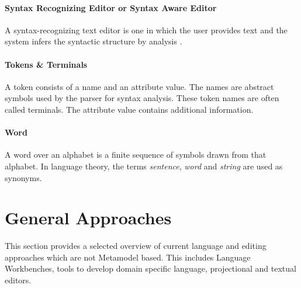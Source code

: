 \paragraph{Syntax Recognizing Editor or Syntax Aware Editor} A syntax-recognizing text editor is one in which the user provides text and the system infers the syntactic structure by analysis \cite{pan}. 

\paragraph{Tokens \& Terminals}  
A token consists of a name and an attribute value. The names are abstract symbols used by the parser for syntax analysis. These token names are often called terminals. The attribute value contains additional information. \cite{DragonBook}

\paragraph{Word} 
A word over an alphabet is a finite sequence of symbols drawn from that alphabet. In language theory, the terms \emph{sentence}, \emph{word} and \emph{string} are used as synonyms. \cite{DragonBook}



\section{General Approaches} \label{sec:generalApproaches}
This section provides a selected overview of current language and editing approaches which are not Metamodel based. This includes Language Workbenches, tools to develop domain specific language, projectional and textual editors.

